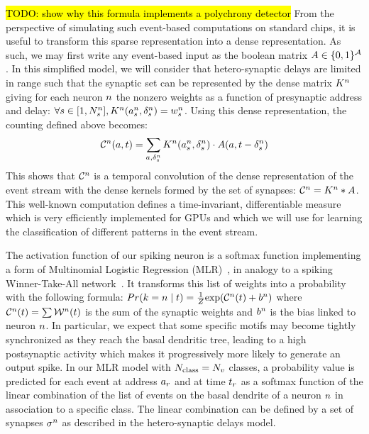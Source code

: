 \documentclass[default]{sn-jnl}%
\theoremstyle{thmstyleone}%
\theoremstyle{thmstyletwo}%
\theoremstyle{thmstylethree}%
\DeclareRobustCommand{\note}[1]{{\sethlcolor{yellow}\hl{#1}}}
\begin{document}
\note{ TODO: show why this formula implements a polychrony detector }
From the perspective of simulating such event-based computations on standard chips, it is useful to transform this sparse representation into a dense representation. As such, we may first write any event-based input as the boolean matrix $A \in \{0, 1 \}^{\mathcal{A}}$. In this simplified model, we will consider that hetero-synaptic delays are limited in range such that the synaptic set can be represented by the dense matrix $K^n$ giving for each neuron $n$ the nonzero weights as a function of presynaptic address and delay: $\forall {s\in [1,N_{s}^n]}, K^n(a_s^n, \delta_s^n) = w_s^n$. 
Using this dense representation, the counting defined above becomes:
$$
\mathcal{C}^n(a,t)
= \sum_{a, \delta_s^n} K^n(a_s^n, \delta_s^n) \cdot A(a, t-\delta_s^n)
$$
%
This shows that $\mathcal{C}^n$ is a temporal convolution of the dense representation of the event stream with the dense kernels formed by the set of synapses:  $\mathcal{C}^n = K^n \ast A$. This well-known computation defines a time-invariant, differentiable measure which is very efficiently implemented for GPUs and which we will use for learning the classification of different patterns in the event stream.
%

The activation function of our spiking neuron is a softmax function implementing a form of  Multinomial Logistic Regression (MLR)~\citep{grimaldi_robust_2022}, in analogy to a spiking Winner-Take-All network~\citep{nessler_bayesian_2013}. 
It transforms this list of weights into a probability with the following formula:
$
Pr(k=n \; \vert \; t) =
\frac 1 Z
{\exp  (\mathcal{C}^n(t) +b^n) }
$ 
where $\mathcal{C}^n(t) = \sum
\mathcal{W}^n(t)
$ is the sum of the synaptic weights and $b^n$ is the bias linked to neuron $n$. 
In particular, we expect that some specific motifs may become tightly synchronized as they reach the basal dendritic tree, leading to a high postsynaptic activity which makes it progressively more likely to generate an output spike.
%
In our MLR model with $N_\text{class}=N_v$ classes, a probability value is predicted for each event at address $a_r$ and at time $t_r$ as a softmax function of the linear combination of the list of events on the basal dendrite of a neuron $n$ in association to a specific class. The linear combination can be defined by a set of synapses $\sigma^n$ as described in the hetero-synaptic delays model. 
\end{document}

